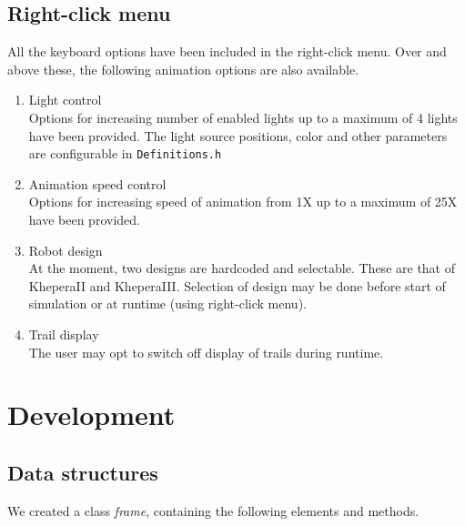 \documentclass[10pt,a4paper]{article}
\begin{document}
\subsection{Right-click menu}
All the keyboard options have been included in the right-click menu. Over and above these, the following animation options are also available.
\begin{enumerate}
\item Light control \\
Options for increasing number of enabled lights up to a maximum of 4 lights have been provided. The light source positions, color and other parameters are configurable in \texttt{Definitions.h}
\item Animation speed control \\
Options for increasing speed of animation from 1X up to a maximum of 25X have been provided.
\item Robot design \\
At the moment, two designs are hardcoded and selectable. These are that of KheperaII and KheperaIII. Selection of design may be done before start of simulation or at runtime (using right-click menu).
\item Trail display \\
The user may opt to switch off display of trails during runtime.
\end{enumerate}

\newpage

\section{Development}
\subsection{Data structures}
We created a class {\it frame}, containing the following elements and methods.
\end{document}
